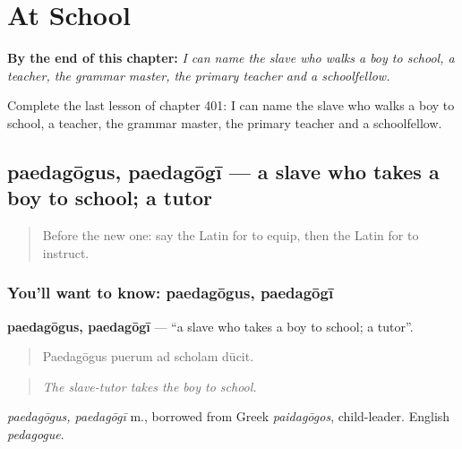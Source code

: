 
\chapter{At School}
\label{ch:la-at-school}

\begin{chapteropening}
\textbf{By the end of this chapter:} \emph{I can name the slave who walks a boy to school, a teacher, the grammar master, the primary teacher and a schoolfellow.}

Complete the last lesson of chapter 401: I can name the slave who walks a boy to school, a teacher, the grammar master, the primary teacher and a schoolfellow.
\end{chapteropening}

\section[paedagōgus, paedagōgī]{paedagōgus, paedagōgī — a slave who takes a boy to school; a tutor}

\label{lesson:LA-C401-paedagogus}



\begin{quote}
Before the new one: say the Latin for to equip, then the Latin for to instruct.
\end{quote}

\subsection*{You'll want to know: paedagōgus, paedagōgī}
\textbf{paedagōgus, paedagōgī} — \textquotedblleft{}a slave who takes a boy to school; a tutor\textquotedblright{}.

\begin{quote}
Paedagōgus puerum ad scholam dūcit.
\end{quote}

\begin{quote}
\emph{The slave-tutor takes the boy to school.}
\end{quote}

\emph{paedagōgus, paedagōgī} m., borrowed from Greek \emph{paidagōgos}, child-leader. English \emph{pedagogue}.

